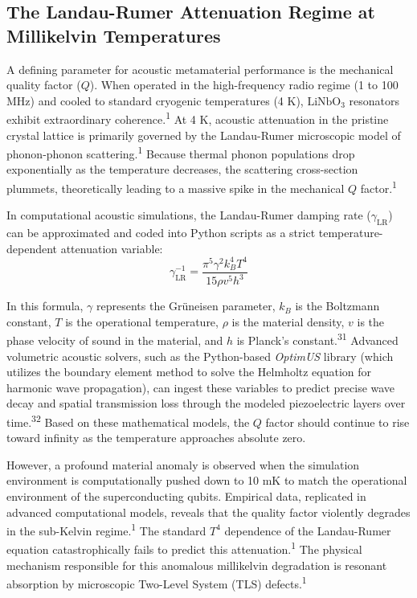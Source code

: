 \documentclass[11pt, a4paper]{article}
\begin{document}
\subsection{The Landau-Rumer Attenuation Regime at Millikelvin Temperatures}

A defining parameter for acoustic metamaterial performance is the mechanical quality factor ($Q$). When operated in the high-frequency radio regime (1 to 100 MHz) and cooled to standard cryogenic temperatures (4 K), $\text{LiNbO}_3$ resonators exhibit extraordinary coherence.\textsuperscript{1} At 4 K, acoustic attenuation in the pristine crystal lattice is primarily governed by the Landau-Rumer microscopic model of phonon-phonon scattering.\textsuperscript{1} Because thermal phonon populations drop exponentially as the temperature decreases, the scattering cross-section plummets, theoretically leading to a massive spike in the mechanical $Q$ factor.\textsuperscript{1}

In computational acoustic simulations, the Landau-Rumer damping rate ($\gamma_{\text{LR}}$) can be approximated and coded into Python scripts as a strict temperature-dependent attenuation variable:
\begin{equation}
\gamma_{\text{LR}}^{-1} = \frac{\pi^5 \gamma^2 k_B^4 T^4}{15\rho v^5 h^3}
\end{equation}

In this formula, $\gamma$ represents the Gr\"uneisen parameter, $k_B$ is the Boltzmann constant, $T$ is the operational temperature, $\rho$ is the material density, $v$ is the phase velocity of sound in the material, and $h$ is Planck's constant.\textsuperscript{31} Advanced volumetric acoustic solvers, such as the Python-based \textit{OptimUS} library (which utilizes the boundary element method to solve the Helmholtz equation for harmonic wave propagation), can ingest these variables to predict precise wave decay and spatial transmission loss through the modeled piezoelectric layers over time.\textsuperscript{32} Based on these mathematical models, the $Q$ factor should continue to rise toward infinity as the temperature approaches absolute zero.

However, a profound material anomaly is observed when the simulation environment is computationally pushed down to 10 mK to match the operational environment of the superconducting qubits. Empirical data, replicated in advanced computational models, reveals that the quality factor violently degrades in the sub-Kelvin regime.\textsuperscript{1} The standard $T^4$ dependence of the Landau-Rumer equation catastrophically fails to predict this attenuation.\textsuperscript{1} The physical mechanism responsible for this anomalous millikelvin degradation is resonant absorption by microscopic Two-Level System (TLS) defects.\textsuperscript{1}
\end{document}
